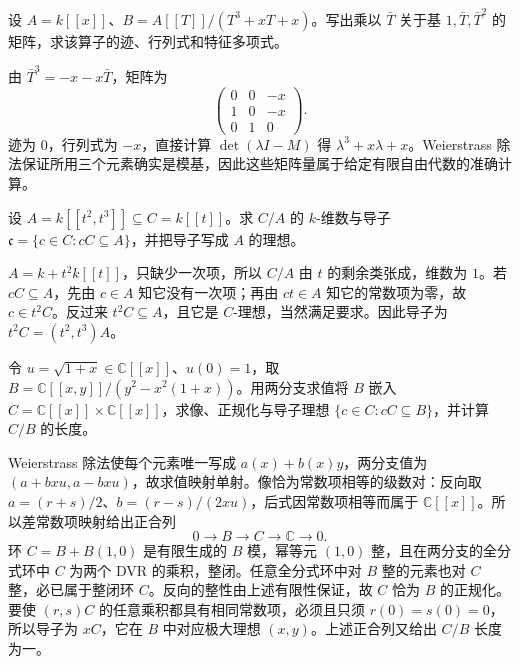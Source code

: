 \begin{exercise}\label{b3:ex:D-finite-multiplication-matrix}
	设 \(A=k[\![x]\!]\)、\(B=A[\![T]\!]/(T^3+xT+x)\)。写出乘以 \(\bar T\) 关于基 \(1,\bar T,\bar T^2\) 的矩阵，求该算子的迹、行列式和特征多项式。
\end{exercise}
\begin{solution}
	由 \(\bar T^3=-x-x\bar T\)，矩阵为
	\[
		\begin{pmatrix}
			0&0&-x\\
			1&0&-x\\
			0&1&0
		\end{pmatrix}.
	\]
	迹为 \(0\)，行列式为 \(-x\)，直接计算 \(\det(\lambda I-M)\) 得 \(\lambda^3+x\lambda+x\)。Weierstrass 除法保证所用三个元素确实是模基，因此这些矩阵量属于给定有限自由代数的准确计算。
\end{solution}

\begin{exercise}\label{b3:ex:D-cusp-conductor}
	设 \(A=k[\![t^2,t^3]\!]\subseteq C=k[\![t]\!]\)。求 \(C/A\) 的 \(k\)-维数与导子 \(\mathfrak c=\{c\in C:cC\subseteq A\}\)，并把导子写成 \(A\) 的理想。
\end{exercise}
\begin{solution}
	\(A=k+t^2k[\![t]\!]\)，只缺少一次项，所以 \(C/A\) 由 \(t\) 的剩余类张成，维数为 \(1\)。若 \(cC\subseteq A\)，先由 \(c\in A\) 知它没有一次项；再由 \(ct\in A\) 知它的常数项为零，故 \(c\in t^2C\)。反过来 \(t^2C\subseteq A\)，且它是 \(C\)-理想，当然满足要求。因此导子为 \(t^2C=(t^2,t^3)A\)。
\end{solution}

\begin{exercise}\label{b3:ex:D-node-completion-branches}
	令 \(u=\sqrt{1+x}\in\mathbb C[\![x]\!]\)、\(u(0)=1\)，取 \(B=\mathbb C[\![x,y]\!]/(y^2-x^2(1+x))\)。用两分支求值将 \(B\) 嵌入 \(C=\mathbb C[\![x]\!]\times\mathbb C[\![x]\!]\)，求像、正规化与导子理想 \(\{c\in C:cC\subseteq B\}\)，并计算 \(C/B\) 的长度。
\end{exercise}
\begin{solution}
	Weierstrass 除法使每个元素唯一写成 \(a(x)+b(x)y\)，两分支值为 \((a+bxu,a-bxu)\)，故求值映射单射。像恰为常数项相等的级数对：反向取 \(a=(r+s)/2\)、\(b=(r-s)/(2xu)\)，后式因常数项相等而属于 \(\mathbb C[\![x]\!]\)。所以差常数项映射给出正合列
	\[
		0\longrightarrow B\longrightarrow C\longrightarrow\mathbb C\longrightarrow0.
	\]
	环 \(C=B+B(1,0)\) 是有限生成的 \(B\) 模，幂等元 \((1,0)\) 整，且在两分支的全分式环中 \(C\) 为两个 DVR 的乘积，整闭。任意全分式环中对 \(B\) 整的元素也对 \(C\) 整，必已属于整闭环 \(C\)。反向的整性由上述有限性保证，故 \(C\) 恰为 \(B\) 的正规化。要使 \((r,s)C\) 的任意乘积都具有相同常数项，必须且只须 \(r(0)=s(0)=0\)，所以导子为 \(xC\)，它在 \(B\) 中对应极大理想 \((x,y)\)。上述正合列又给出 \(C/B\) 长度为一。
\end{solution}

